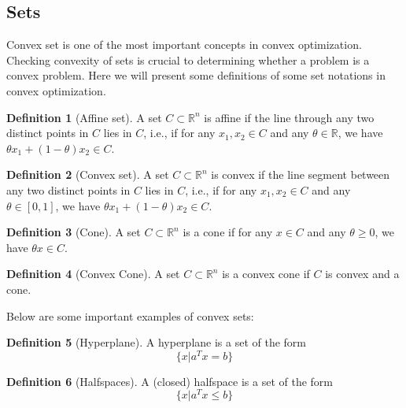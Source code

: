 \documentclass[
]{book}
\theoremstyle{definition}
\newtheorem{definition}{Definition}[chapter]
\theoremstyle{definition}
\theoremstyle{definition}
\theoremstyle{definition}
\theoremstyle{remark}
\begin{document}
\hypertarget{sets}{%
\subsection{Sets}\label{sets}}

Convex set is one of the most important concepts in convex optimization. Checking convexity of sets is crucial to determining whether a problem is a convex problem. Here we will present some definitions of some set notations in convex optimization.

\begin{definition}[Affine set]
\protect\hypertarget{def:affineset}{}\label{def:affineset}A set \(C\subset \mathbb{R}^n\) is affine if the line through any two distinct points in \(C\) lies in \(C\), i.e., if for any \(x_1,x_2 \in C\) and any \(\theta \in \mathbb{R}\), we have \(\theta x_1 + (1-\theta)x_2 \in C\).
\end{definition}

\begin{definition}[Convex set]
\protect\hypertarget{def:convexset}{}\label{def:convexset}A set \(C\subset \mathbb{R}^n\) is convex if the line segment between any two distinct points in \(C\) lies in \(C\), i.e., if for any \(x_1,x_2 \in C\) and any \(\theta \in [0,1]\), we have \(\theta x_1 + (1-\theta)x_2 \in C\).
\end{definition}

\begin{definition}[Cone]
\protect\hypertarget{def:cone}{}\label{def:cone}A set \(C\subset \mathbb{R}^n\) is a cone if for any \(x\in C\) and any \(\theta\geq 0\), we have \(\theta x \in C\).
\end{definition}

\begin{definition}[Convex Cone]
\protect\hypertarget{def:convexcone}{}\label{def:convexcone}A set \(C\subset \mathbb{R}^n\) is a convex cone if \(C\) is convex and a cone.
\end{definition}

Below are some important examples of convex sets:

\begin{definition}[Hyperplane]
\protect\hypertarget{def:hyperplane}{}\label{def:hyperplane}A hyperplane is a set of the form \[\{x|a^Tx = b\}\]
\end{definition}

\begin{definition}[Halfspaces]
\protect\hypertarget{def:halfspaces}{}\label{def:halfspaces}A (closed) halfspace is a set of the form \[\{x|a^Tx \leq b\}\]
\end{definition}
\end{document}

